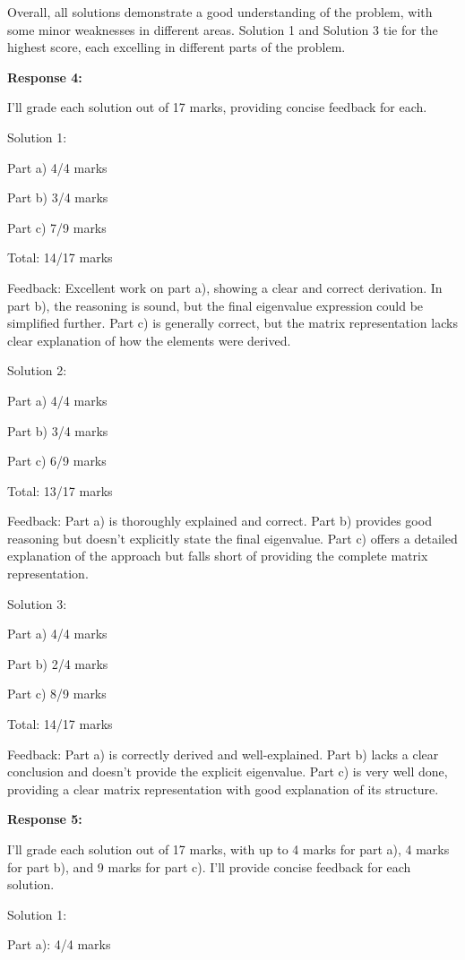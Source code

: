 \documentclass[a4paper,11pt]{article}
\begin{document}
Overall, all solutions demonstrate a good understanding of the problem, with some minor weaknesses in different areas. Solution 1 and Solution 3 tie for the highest score, each excelling in different parts of the problem.

\bigskip   
\textbf{Response 4:}

I'll grade each solution out of 17 marks, providing concise feedback for each.

Solution 1:

Part a) 4/4 marks

Part b) 3/4 marks

Part c) 7/9 marks

Total: 14/17 marks

Feedback: Excellent work on part a), showing a clear and correct derivation. In part b), the reasoning is sound, but the final eigenvalue expression could be simplified further. Part c) is generally correct, but the matrix representation lacks clear explanation of how the elements were derived.

Solution 2:

Part a) 4/4 marks

Part b) 3/4 marks

Part c) 6/9 marks

Total: 13/17 marks

Feedback: Part a) is thoroughly explained and correct. Part b) provides good reasoning but doesn't explicitly state the final eigenvalue. Part c) offers a detailed explanation of the approach but falls short of providing the complete matrix representation.

Solution 3:

Part a) 4/4 marks

Part b) 2/4 marks

Part c) 8/9 marks

Total: 14/17 marks

Feedback: Part a) is correctly derived and well-explained. Part b) lacks a clear conclusion and doesn't provide the explicit eigenvalue. Part c) is very well done, providing a clear matrix representation with good explanation of its structure.

\bigskip   
\textbf{Response 5:}

I'll grade each solution out of 17 marks, with up to 4 marks for part a), 4 marks for part b), and 9 marks for part c). I'll provide concise feedback for each solution.

Solution 1:

Part a): 4/4 marks
\end{document}
